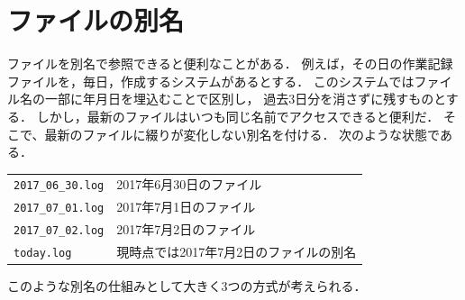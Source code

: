 \section{ファイルの別名}
ファイルを別名で参照できると便利なことがある．
例えば，その日の作業記録ファイルを，毎日，作成するシステムがあるとする．
このシステムではファイル名の一部に年月日を埋込むことで区別し，
過去3日分を消さずに残すものとする．
しかし，最新のファイルはいつも同じ名前でアクセスできると便利だ．
そこで、最新のファイルに綴りが変化しない別名を付ける．
次のような状態である．

\begin{center}
\begin{tabular}{l l}
\texttt{2017\_06\_30.log}   & 2017年6月30日のファイル \\
\texttt{2017\_07\_01.log}   & 2017年7月1日のファイル  \\
\texttt{2017\_07\_02.log}   & 2017年7月2日のファイル  \\
\texttt{today.log}          & 現時点では2017年7月2日のファイルの別名
\end{tabular}
\end{center}

このような別名の仕組みとして大きく3つの方式が考えられる．

